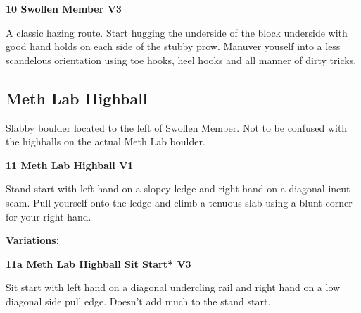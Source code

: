 \begin{multicols}{2}
		
			
			\needspace{1.5cm}
\label{rt:Swollen Member}
\colorbox{green!20}{
\parbox{0.95\linewidth}{
\textbf{
10 Swollen Member V3  
}}}

			\begin{adjustwidth}{0.5cm}{}			
			A classic hazing route. Start hugging the underside of the block underside with good hand holds on each side of the stubby prow. Manuver youself into a less scandelous orientation using toe hooks, heel hooks and  all manner of dirty tricks.
			\end{adjustwidth}
			
			
		
		
		\needspace{1.5cm}
		\subsection*{Meth Lab Highball}\label{bf:Meth Lab Highball}
		Slabby boulder located to the left of Swollen Member. Not to be confused with the highballs on the actual Meth Lab boulder.\\
	
		
			
			\needspace{1.5cm}
\label{rt:Meth Lab Highball}
\colorbox{green!20}{
\parbox{0.95\linewidth}{
\textbf{
11 Meth Lab Highball V1  \warn
}}}

			\begin{adjustwidth}{0.5cm}{}			
			Stand start with left hand on a slopey ledge and right hand on a diagonal incut seam. Pull yourself onto the ledge and climb a tenuous slab using a blunt corner for your right hand.
			\end{adjustwidth}
			
				\begin{adjustwidth}{0.5cm}{}				
				\needspace{3cm}
				\textbf{Variations:} \newline
					
					\needspace{1.5cm}
\label{vr:Meth Lab Highball Sit Start}
\colorbox{green!20}{
\parbox{0.95\linewidth}{
\textbf{
11a Meth Lab Highball Sit Start* V3  
}}}

					\begin{adjustwidth}{0.5cm}{}			
					Sit start with left hand on a diagonal undercling rail and right hand on a low diagonal side pull edge. Doesn't add much to the stand start.
					\end{adjustwidth}
					
					
				\end{adjustwidth}
			

\end{multicols}
